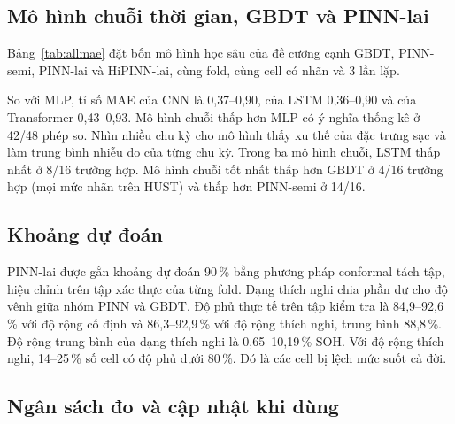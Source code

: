 \subsection{Mô hình chuỗi thời gian, GBDT và PINN-lai}\label{sec:e20res}

Bảng~\ref{tab:allmae} đặt bốn mô hình học sâu của đề cương cạnh GBDT, PINN-semi, PINN-lai và HiPINN-lai, cùng fold, cùng
cell có nhãn và 3 lần lặp.



So với MLP, tỉ số MAE của CNN là 0{,}37--0{,}90, của LSTM 0{,}36--0{,}90 và của Transformer 0{,}43--0{,}93. Mô hình chuỗi
thấp hơn MLP có ý nghĩa thống kê ở 42/48 phép so. Nhìn nhiều chu kỳ cho mô hình thấy xu thế của đặc trưng sạc và làm
trung bình nhiễu đo của từng chu kỳ. Trong ba mô hình chuỗi, LSTM thấp nhất ở 8/16 trường hợp. Mô hình chuỗi tốt nhất
thấp hơn GBDT ở 4/16 trường hợp (mọi mức nhãn trên HUST) và thấp hơn PINN-semi ở 14/16.









\subsection{Khoảng dự đoán}\label{sec:conformal}

PINN-lai được gắn khoảng dự đoán 90\,\% bằng phương pháp conformal tách tập, hiệu chỉnh trên tập xác thực của từng fold.
Dạng thích nghi chia phần dư cho độ vênh giữa nhóm PINN và GBDT. Độ phủ thực tế trên tập kiểm tra là 84{,}9--92{,}6\,\% với
độ rộng cố định và 86{,}3--92{,}9\,\% với độ rộng thích nghi, trung bình 88{,}8\,\%. Độ rộng trung bình của dạng thích nghi
là 0{,}65--10{,}19\,\% SOH. Với độ rộng thích nghi, 14--25\,\% số cell có độ phủ dưới 80\,\%. Đó là các cell bị lệch mức
suốt cả đời.

\subsection{Ngân sách đo và cập nhật khi dùng}\label{sec:budgetres}



